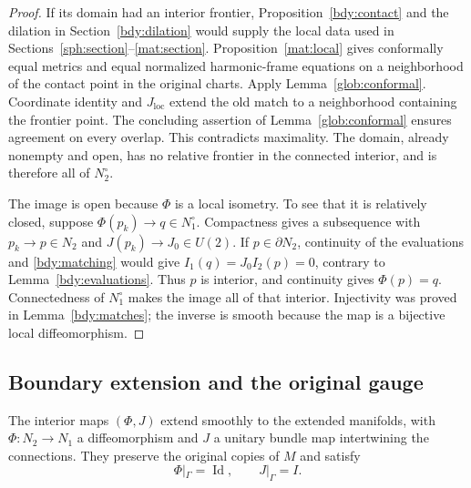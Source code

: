 \begin{proof}
If its domain had an interior frontier,
Proposition~\ref{bdy:contact} and the dilation in
Section~\ref{bdy:dilation} would supply the local data used in
Sections~\ref{sph:section}--\ref{mat:section}.
Proposition~\ref{mat:local} gives conformally equal metrics and
equal normalized harmonic-frame equations on a neighborhood of
the contact point in the original charts.  Apply
Lemma~\ref{glob:conformal}.
Coordinate identity and \(J_{\mathrm{loc}}\) extend the old match
to a neighborhood containing the frontier point.  The concluding
assertion of Lemma~\ref{glob:conformal} ensures agreement on every
overlap.  This contradicts maximality.  The
domain, already nonempty and open, has no relative frontier in
the connected interior, and is therefore all of \(N_2^\circ\).

The image is open because \(\Phi\) is a local isometry.  To see
that it is relatively closed, suppose \(\Phi(p_k)\to q\in
N_1^\circ\).  Compactness gives a subsequence with \(p_k\to p\in
N_2\) and \(J(p_k)\to J_0\in U(2)\).  If \(p\in\partial N_2\),
continuity of the evaluations and \eqref{bdy:matching} would give
\(I_1(q)=J_0I_2(p)=0\), contrary to
Lemma~\ref{bdy:evaluations}.  Thus \(p\) is interior, and
continuity gives \(\Phi(p)=q\).  Connectedness of \(N_1^\circ\)
makes the image all of that interior.  Injectivity was proved in
Lemma~\ref{bdy:matches}; the inverse is smooth because the map
is a bijective local diffeomorphism.
\end{proof}

\subsection{Boundary extension and the original gauge}

\begin{proposition}\label{glob:boundary}
The interior maps \((\Phi,J)\) extend smoothly to the extended
manifolds, with \(\Phi:N_2\to N_1\) a diffeomorphism and \(J\)
a unitary bundle map intertwining the connections.  They preserve
the original copies of \(M\) and satisfy
\[
                  \Phi|_\Gamma=\operatorname{Id},\qquad J|_\Gamma=I.
\]
\end{proposition}

